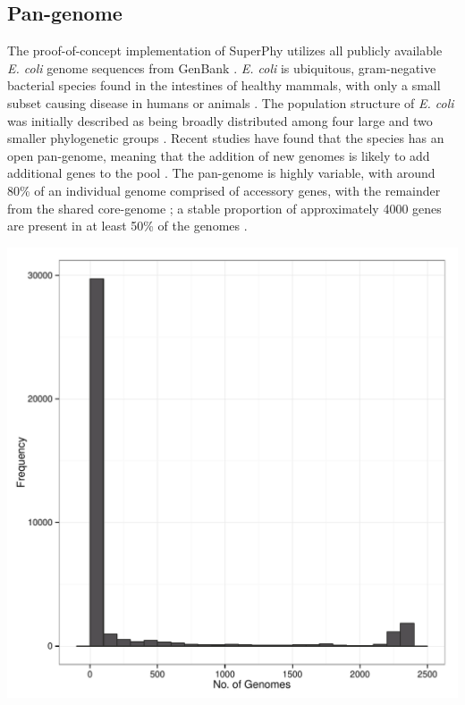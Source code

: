 \documentclass{bmcart}
\begin{document}
\subsection{Pan-genome}
The proof-of-concept implementation of SuperPhy utilizes all publicly available \textit{E. coli} genome sequences from GenBank \cite{benson_genbank_2012}. \textit{E. coli} is ubiquitous, gram-negative bacterial species found in the intestines of healthy mammals, with only a small subset causing disease in humans or animals \cite{tenaillon_population_2010}. The population structure of \textit{E. coli} was initially described as being broadly distributed among four large and two smaller phylogenetic groups \cite{selander_methods_1986,goullet_comparative_1989}. Recent studies have found that the species has an open pan-genome, meaning that the addition of new genomes is likely to add additional genes to the pool \cite{medini_microbial_2005}. The pan-genome is highly variable, with around 80\% of an individual genome comprised of accessory genes, with the remainder from the shared core-genome \cite{lukjancenko_comparison_2010}; a stable proportion of approximately 4000 genes are present in at least 50\% of the genomes \cite{gordienko_evolution_2013}.

\includegraphics[width=\textwidth]{images/panGenomeSize.pdf}
\end{document}
